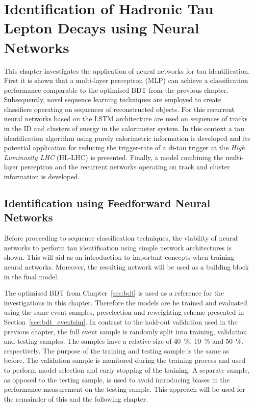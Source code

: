 \chapter{Identification of Hadronic Tau Lepton Decays using Neural Networks}
\label{sec:rnn}

This chapter investigates the application of neural networks for tau
identification. First it is shown that a multi-layer perceptron (MLP) can
achieve a classification performance comparable to the optimised BDT from the
previous chapter. Subsequently, novel sequence learning techniques are employed
to create classifiers operating on sequences of reconstructed objects. For this
recurrent neural networks based on the LSTM architecture are used on sequences
of tracks in the ID and clusters of energy in the calorimeter system. In this
context a tau identification algorithm using purely calorimetric information is
developed and its potential application for reducing the trigger-rate of a
di-tau trigger at the \emph{High Luminosity LHC} (HL-LHC) is presented. Finally,
a model combining the multi-layer perceptron and the recurrent networks
operating on track and cluster information is developed.

\section{Identification using Feedforward Neural Networks}
\label{sec:ffnn_id}

Before proceeding to sequence classification techniques, the viability of neural
networks to perform tau identification using simple network architectures is
shown. This will aid as an introduction to important concepts when training
neural networks. Moreover, the resulting network will be used as a building
block in the final model.

The optimised BDT from Chapter~\ref{sec:bdt} is used as a reference for the
investigations in this chapter. Therefore the models are be trained and
evaluated using the same event samples, preselection and reweighting scheme
presented in Section~\ref{sec:bdt_eventsim}. In contrast to the hold-out
validation used in the previous chapter, the full event sample is randomly split
into training, validation and testing samples. The samples have a relative size
of \SI{40}{\percent}, \SI{10}{\percent} and \SI{50}{\percent}, respectively. The
purpose of the training and testing sample is the same as before. The validation
sample is monitored during the training process and used to perform model
selection and early stopping of the training. A separate sample, as opposed to
the testing sample, is used to avoid introducing biases in the performance
measurement on the testing sample. This approach will be used for the remainder
of this and the following chapter.

